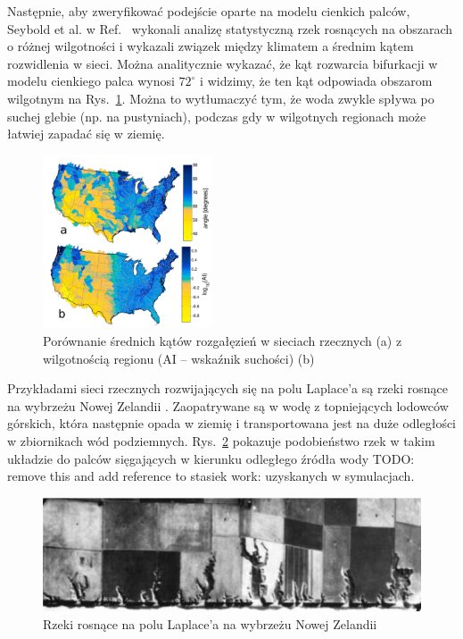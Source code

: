 \documentclass[]{pracamgr}
\begin{document}
      Następnie, aby zweryfikować podejście oparte na modelu cienkich palców, Seybold et al. w Ref.~\cite{seybold2017climate, seybold2018branching} wykonali analizę statystyczną rzek rosnących na obszarach o różnej wilgotności i wykazali związek między klimatem a średnim kątem rozwidlenia w sieci. Można analitycznie wykazać, że kąt rozwarcia bifurkacji w modelu cienkiego palca wynosi $72^\circ$ \cite{hastings2001growth, carleson2002laplacian, gubiec2008fingered, devauchelle2012ramification} i widzimy, że ten kąt odpowiada obszarom wilgotnym na Rys.~\ref{klimat_katy}. Można to wytłumaczyć tym, że woda zwykle spływa po suchej glebie (np. na pustyniach), podczas gdy w wilgotnych regionach może łatwiej zapadać się w ziemię.

      \begin{figure}[H]
        \centering
        \includegraphics[width=0.45\textwidth]{figs/klimat_katy.png}
        \caption{Porównanie średnich kątów rozgałęzień w sieciach rzecznych (a) z wilgotnością regionu (AI -- wskaźnik suchości) (b)}
        \label{klimat_katy}
      \end{figure}

      Przykładami sieci rzecznych rozwijających się na polu Laplace'a są rzeki rosnące na wybrzeżu Nowej Zelandii \cite{schumm1986composite}. Zaopatrywane są w wodę z topniejących lodowców górskich, która następnie opada w ziemię i transportowana jest na duże odległości w zbiornikach wód podziemnych. Rys.~\ref{nowa_zelandia} pokazuje podobieństwo rzek w takim układzie do palców sięgających w kierunku odległego źródła wody TODO: remove this and add reference to stasiek work: uzyskanych w symulacjach.

      \begin{figure}[h]
        \centering
        \includegraphics[width=1\textwidth]{figs/nowa_zelandia.png}
        \caption{Rzeki rosnące na polu Laplace'a na wybrzeżu Nowej Zelandii \cite{schumm1986composite}}
        \label{nowa_zelandia}
        \vspace{0pt}
      \end{figure}
\end{document}

